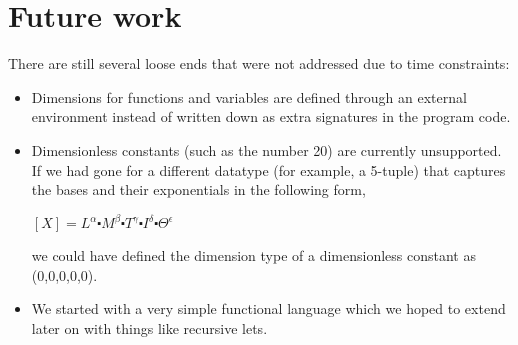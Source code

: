 \documentclass[a4paper,10pt]{article}
\begin{document}
\section{Future work}\label{futurework}
There are still several loose ends that were not addressed due to time constraints:
\begin{itemize}
	\item Dimensions for functions and variables are defined through an external environment instead of written down as extra signatures in the program code.
	\item Dimensionless constants (such as the number 20) are currently unsupported. If we had gone for a different datatype (for example, a 5-tuple) that captures the bases and their exponentials in the following form,
\begin{center}
	$[X] = L^\alpha \centerdot M^\beta \centerdot T^\gamma \centerdot I^\delta \centerdot \Theta^\epsilon$
\end{center}
we could have defined the dimension type of a dimensionless constant as (0,0,0,0,0).
	\item We started with a very simple functional language which we hoped to extend later on with things like recursive lets.
\end{itemize}




\end{document}
